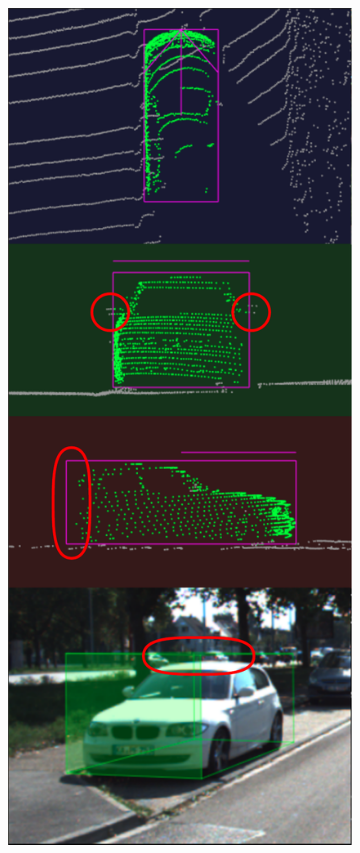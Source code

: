 \documentclass[letterpaper, 10 pt, conference]{ieeeconf}  %
\begin{document}
\begin{figure}
	\centering
	\begin{subfigure}{0.3\linewidth}
		\includegraphics[scale=0.2]{./figures/annocheck-0}
	\end{subfigure}

\end{figure}
\end{document}
